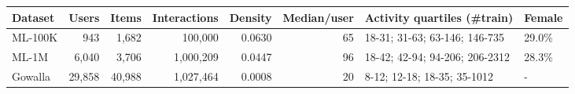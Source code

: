 \begin{tabular}{lrrrrrll}
\toprule
Dataset & Users & Items & Interactions & Density & Median/user & Activity quartiles (\#train) & Female \\
\midrule
ML-100K & 943 & 1,682 & 100,000 & 0.0630 & 65 & 18-31; 31-63; 63-146; 146-735 & 29.0\% \\
ML-1M & 6,040 & 3,706 & 1,000,209 & 0.0447 & 96 & 18-42; 42-94; 94-206; 206-2312 & 28.3\% \\
Gowalla & 29,858 & 40,988 & 1,027,464 & 0.0008 & 20 & 8-12; 12-18; 18-35; 35-1012 & - \\
\bottomrule
\end{tabular}
